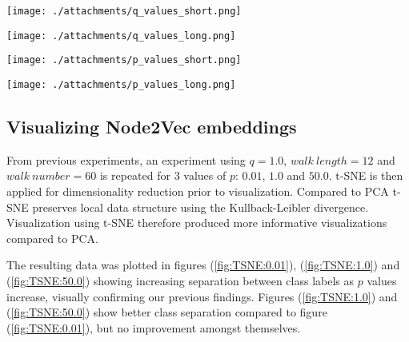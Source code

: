 \documentclass[a4paper,10pt]{article}
\begin{document}

  \begin{minipage}[c][18em][c]{0.49\textwidth}
    \texttt{[image: ./attachments/q\_values\_short.png]}
    \label{fig:q-values:short}
  \end{minipage}
  \hfill
  \begin{minipage}[c][18em][c]{0.49\textwidth}
    \texttt{[image: ./attachments/q\_values\_long.png]}
    \label{fig:q-values:long}
  \end{minipage}

\begin{minipage}[c][18em][c]{0.49\textwidth}
  \texttt{[image: ./attachments/p\_values\_short.png]}
  \label{fig:p-values:short}
\end{minipage}
\hfill
\begin{minipage}[c][18em][c]{0.49\textwidth}
  \texttt{[image: ./attachments/p\_values\_long.png]}
  \label{fig:p-values:long}
\end{minipage}

\subsection{Visualizing Node2Vec embeddings}

From previous experiments, an experiment using $q = 1.0$, $walk \ length = 12$ and $walk \ number = 60$ is repeated for 3 values of $p$: $0.01$, $1.0$ and $50.0$. t-SNE is then applied for dimensionality reduction prior to visualization. Compared to PCA t-SNE preserves local data structure using the Kullback-Leibler divergence. Visualization using t-SNE therefore produced more informative visualizations compared to PCA.

The resulting data was plotted in figures (\ref{fig:TSNE:0.01}), (\ref{fig:TSNE:1.0}) and (\ref{fig:TSNE:50.0}) showing increasing separation between class labels as $p$ values increase, visually confirming our previous findings. Figures (\ref{fig:TSNE:1.0}) and (\ref{fig:TSNE:50.0}) show better class separation compared to figure (\ref{fig:TSNE:0.01}), but no improvement amongst themselves.
\end{document}
